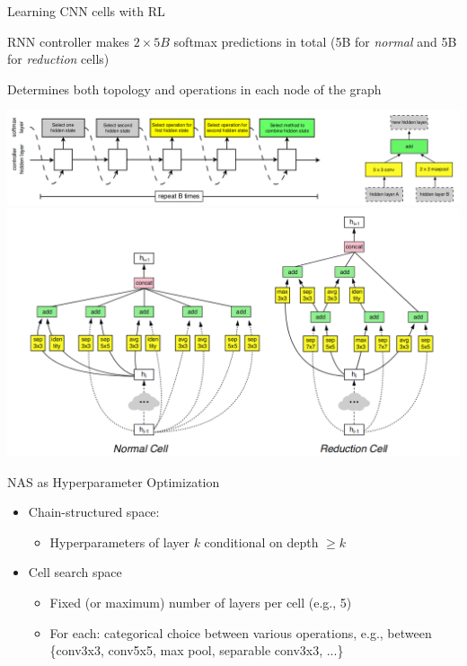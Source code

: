 \begin{frame}[c]{Learning CNN cells with RL }
\centering

\begin{itemize}
	\footnotesize{
	\item RNN controller makes $2\times 5B$ softmax predictions in total 
	(5B for \textit{normal} and 5B for \textit{reduction} cells)
	\item Determines both topology and operations in each node of the graph
	}
\end{itemize}
\includegraphics[width=.8\textwidth]{images_lec7/RL_conv_cell}
\includegraphics[width=.7\textwidth]{images_lec7/RL_normal_reduction}

\end{frame}

\begin{frame}[c]{NAS as Hyperparameter Optimization}
\begin{itemize}
	\item Chain-structured space:
	\begin{itemize}
		\item Hyperparameters of layer $k$ conditional on depth $\geq k$
	\end{itemize}
	\item Cell search space
	\begin{itemize}
		\item Fixed (or maximum) number of layers per cell (e.g., 5)
		\item For each: categorical choice between various operations, e.g.,
		between \{conv3x3, conv5x5, max pool, separable conv3x3, ...\}
	\end{itemize}
\end{itemize}

\end{frame}

